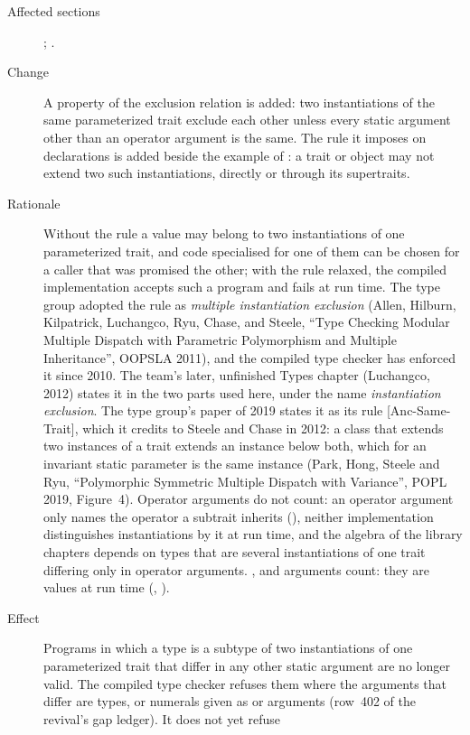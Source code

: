 \begin{description}
\item[Affected sections] ; .
\item[Change] A property of the exclusion relation is added:
two instantiations of the same parameterized trait exclude each other
unless every static argument other than an operator argument is the same.
The rule it imposes on declarations is added beside the example of
: a trait or object may not extend two such
instantiations, directly or through its supertraits.
\item[Rationale] Without the rule a value may belong to two instantiations
of one parameterized trait, and code specialised for one of them can be
chosen for a caller that was promised the other; with the rule relaxed, the
compiled implementation accepts such a program and fails at run time.
The type group adopted the rule as \emph{multiple instantiation exclusion}
(Allen, Hilburn, Kilpatrick, Luchangco, Ryu, Chase, and Steele, ``Type
Checking Modular Multiple Dispatch with Parametric Polymorphism and
Multiple Inheritance'', OOPSLA 2011), and the compiled type checker has
enforced it since 2010.
The team's later, unfinished Types chapter (Luchangco, 2012) states it in
the two parts used here, under the name \emph{instantiation exclusion}.
The type group's paper of 2019 states it as its rule [Anc-Same-Trait], which
it credits to Steele and Chase in 2012: a class that extends two instances of
a trait extends an instance below both, which for an invariant static
parameter is the same instance (Park, Hong, Steele and Ryu, ``Polymorphic
Symmetric Multiple Dispatch with Variance'', POPL 2019, Figure~4).
Operator arguments do not count: an operator argument only names the
operator a subtrait inherits (), neither implementation
distinguishes instantiations by it at run time, and the algebra of the
library chapters depends on types that are several instantiations of one
trait differing only in operator arguments.
,  and  arguments count: they are values at
run time (, ).
\item[Effect] Programs in which a type is a subtype of two instantiations
of one parameterized trait that differ in any other static argument are no
longer valid. The compiled type checker refuses them where the arguments
that differ are types, or numerals given as  or 
arguments (row~402 of the revival's gap ledger). It does not yet refuse

\end{description}

